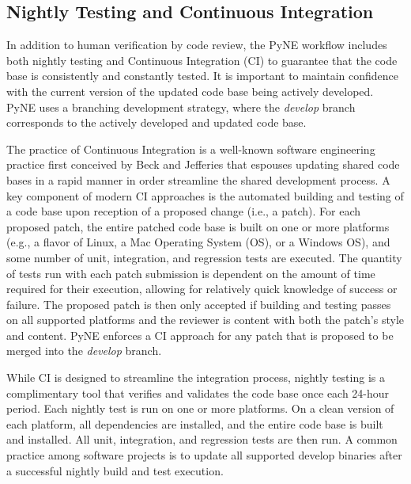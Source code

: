 \documentclass{anstrans}
\begin{document}


\subsection{Nightly Testing and Continuous Integration} 

In addition to human verification by code review, the PyNE
workflow includes both nightly testing and Continuous Integration (CI) to
guarantee that the code base is consistently and constantly tested.
It is important to maintain confidence with the current version of
the updated code base being actively developed. PyNE uses a branching
development strategy, where the \textit{develop} branch corresponds to the
actively developed and updated code base.

The practice of Continuous Integration is a well-known software engineering
practice first conceived by Beck and Jefferies \cite{beck1998extreme} that
espouses updating shared code bases in a rapid manner in order streamline the
shared development process. A key component of modern CI approaches is the
automated building and testing of a code base upon reception of a proposed
change (i.e., a patch). For each proposed patch, the entire patched code base is
built on one or more platforms (e.g., a flavor of Linux, a Mac Operating System
(OS), or a Windows OS), and some number of unit, integration, and regression
tests are executed. The quantity of tests run with each patch submission is
dependent on the amount of time required for their execution, allowing for
relatively quick knowledge of success or failure. The proposed patch is then only
accepted if building and testing passes on all supported platforms and the
reviewer is content with both the patch's style and content. PyNE enforces a CI
approach for any patch that is proposed to be merged into the \textit{develop}
branch.

While CI is designed to streamline the integration process, nightly testing is a
complimentary tool that verifies and validates the code base once each 24-hour
period. Each nightly test is run on one or more platforms. On a clean version of
each platform, all dependencies are installed, and the entire code base is built
and installed. All unit, integration, and regression tests are then run. A
common practice among software projects is to update all supported develop
binaries after a successful nightly build and test execution.
\end{document}
